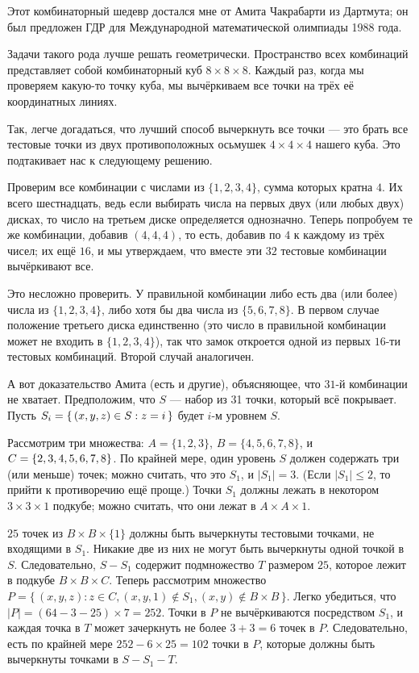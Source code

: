 Этот комбинаторный шедевр достался мне от Амита Чакрабарти из Дартмута;
он был предложен ГДР для Международной математической олимпиады 1988 года.

Задачи такого рода лучше решать геометрически.
Пространство всех комбинаций представляет собой комбинаторный куб $8 \times 8 \times 8$.
Каждый раз, когда мы проверяем какую-то точку куба, мы вычёркиваем все точки на трёх её координатных линиях.

Так, легче догадаться, что лучший способ вычеркнуть все точки --- это брать все тестовые точки из двух противоположных осьмушек $4 \times 4 \times 4$ нашего куба.
Это подтакивает нас к следующему решению.

Проверим все комбинации с числами из $\{1, 2, 3, 4\}$, сумма которых кратна $4$.
Их всего шестнадцать, ведь если выбирать числа на первых двух (или любых двух) дисках, то число на третьем диске определяется однозначно.
Теперь попробуем те же комбинации, добавив $(4,4,4)$, то есть, добавив по $4$ к каждому из трёх чисел;
их ещё $16$, и мы утверждаем, что вместе эти $32$ тестовые комбинации вычёркивают все.

Это несложно проверить.
У правильной комбинации либо есть два (или более) числа из $\{1, 2, 3, 4\}$, либо хотя бы два числа из  $\{5, 6, 7, 8\}$.
В первом случае положение третьего диска единственно (это число в правильной комбинации может не входить в $\{1, 2, 3, 4\}$), так что замок откроется одной из первых $16$-ти тестовых комбинаций.
Второй случай аналогичен.

А вот доказательство Амита (есть и другие), объясняющее, что $31$-й комбинации не хватает.
Предположим, что $S$ --- набор из 31 точки, который всё покрывает.
Пусть $S_i = \{\,(x, y, z) \z\in S : z = i\,\}$ будет $i$-м уровнем $S$.

Рассмотрим три множества:
$A=\{1, 2, 3\}$,
$B = \{4, 5, 6, 7, 8\}$,
и $C \z= \{2, 3, 4, 5, 6, 7, 8\}$.
По крайней мере, один уровень $S$ должен содержать три (или меньше) точек;
можно считать, что это $S_1$, и $|S_1| = 3$.
(Если $|S_1| \le 2$, то прийти к противоречию ещё проще.)
Точки $S_1$ должны лежать в некотором $3 \times 3 \times 1$ подкубе;
можно считать, что они лежат в $A \times A \times {1}$.

$25$ точек из $B \times B \times \{1\}$ должны быть вычеркнуты тестовыми точками, не входящими в $S_1$.
Никакие две из них не могут быть вычеркнуты одной точкой в $S$.
Следовательно, $S - S_1$ содержит подмножество $T$ размером $25$, которое лежит в подкубе $B \times B \times C$.
Теперь рассмотрим множество $P = \{\,(x, y, z) : z \in C, (x, y, 1) \notin S_1 , (x, y) \notin B \times B\,\}$.
Легко убедиться, что $|P| = (64-3-25) \times 7 = 252$.
Точки в $P$ не вычёркиваются посредством $S_1$, и каждая точка в $T$ может зачеркнуть не более $3 + 3 = 6$ точек в $P$. Следовательно, есть по крайней мере $252 - 6 \times 25 = 102$ точки в $P$, которые должны быть вычеркнуты точками в $S - S_1 - T$.


